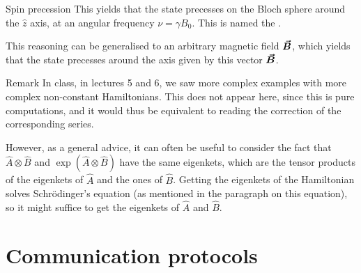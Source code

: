 \documentclass[a4paper]{article}
\begin{document}
\begin{parag}{Spin precession}
    This yields that the state precesses on the Bloch sphere around the $\hat{z}$ axis, at an angular frequency $\nu = \gamma B_0$. This is named the . 

    This reasoning can be generalised to an arbitrary magnetic field $\bm{\protect\vec{B}}$, which yields that the state precesses around the axis given by this vector $\bm{\protect\vec{B}}$.

    \begin{subparag}{Remark}
        In class, in lectures 5 and 6, we saw more complex examples with more complex non-constant Hamiltonians. This does not appear here, since this is pure computations, and it would thus be equivalent to reading the correction of the corresponding series.

        However, as a general advice, it can often be useful to consider the fact that $\hat{A} \otimes \hat{B}$ and $\exp\left(\hat{A} \otimes \hat{B}\right)$ have the same eigenkets, which are the tensor products of the eigenkets of $\hat{A}$ and the ones of $\hat{B}$. Getting the eigenkets of the Hamiltonian solves Schrödinger's equation (as mentioned in the paragraph on this equation), so it might suffice to get the eigenkets of $\hat{A}$ and $\hat{B}$.
    \end{subparag}
\end{parag}

\section{Communication protocols}
\end{document}
